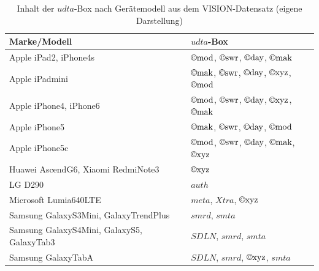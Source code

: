 \begin{table}[h]
\centering
\begin{tabular}{ll}
\toprule
\textbf{Marke/Modell} & \textbf{\(udta\)-Box}\\
\midrule
Apple iPad2, iPhone4s & \(\text{\textcopyright{}mod}\), \(\text{\textcopyright{}swr}\), \(\text{\textcopyright{}day}\), \(\text{\textcopyright{}mak}\) \\
Apple iPadmini & \(\text{\textcopyright{}mak}\), \(\text{\textcopyright{}swr}\), \(\text{\textcopyright{}day}\), \(\text{\textcopyright{}xyz}\), \(\text{\textcopyright{}mod}\) \\
Apple iPhone4, iPhone6 & \(\text{\textcopyright{}mod}\), \(\text{\textcopyright{}swr}\), \(\text{\textcopyright{}day}\), \(\text{\textcopyright{}xyz}\), \(\text{\textcopyright{}mak}\) \\
Apple iPhone5 & \(\text{\textcopyright{}mak}\), \(\text{\textcopyright{}swr}\), \(\text{\textcopyright{}day}\), \(\text{\textcopyright{}mod}\) \\
Apple iPhone5c & \(\text{\textcopyright{}mod}\), \(\text{\textcopyright{}swr}\), \(\text{\textcopyright{}day}\), \(\text{\textcopyright{}mak}\), \(\text{\textcopyright{}xyz}\) \\
Huawei AscendG6, Xiaomi RedmiNote3 & \(\text{\textcopyright{}xyz}\) \\
LG D290 & \(auth\) \\
Microsoft Lumia640LTE & \(meta\), \(Xtra\), \(\text{\textcopyright{}xyz}\) \\
Samsung GalaxyS3Mini, GalaxyTrendPlus & \(smrd\), \(smta\) \\
Samsung GalaxyS4Mini, GalaxyS5, GalaxyTab3 & \(SDLN\), \(smrd\), \(smta\) \\
Samsung GalaxyTabA & \(SDLN\), \(smrd\), \(\text{\textcopyright{}xyz}\), \(smta\) \\
\bottomrule
\end{tabular}
\caption{Inhalt der \(udta\)-Box nach Gerätemodell aus dem VISION-Datensatz \cite{shullani_vision_2017} (eigene Darstellung)}
\label{tab:udta_modell}
\end{table}

